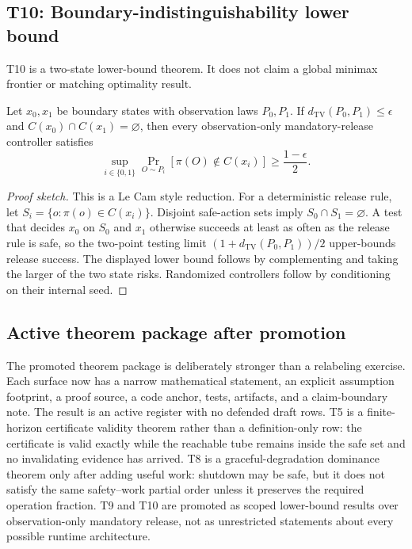 \subsection{T10: Boundary-indistinguishability lower bound}
T10 is a two-state lower-bound theorem.  It does not claim a global minimax
frontier or matching optimality result.

\begin{theorem}
\label{thm:prof-t10}
Let \(x_0,x_1\) be boundary states with observation laws \(P_0,P_1\). If
\(d_{\mathrm{TV}}(P_0,P_1)\le\epsilon\) and
\(C(x_0)\cap C(x_1)=\varnothing\), then every observation-only
mandatory-release controller satisfies
\[
  \sup_{i\in\{0,1\}}\Pr_{O\sim P_i}[\pi(O)\notin C(x_i)]
  \ge \frac{1-\epsilon}{2}.
\]
\end{theorem}

\begin{proof}[Proof sketch]
This is a Le Cam style reduction.  For a deterministic release rule, let
\(S_i=\{o:\pi(o)\in C(x_i)\}\).  Disjoint safe-action sets imply
\(S_0\cap S_1=\varnothing\).  A test that decides \(x_0\) on \(S_0\) and
\(x_1\) otherwise succeeds at least as often as the release rule is safe, so the
two-point testing limit \((1+d_{\mathrm{TV}}(P_0,P_1))/2\) upper-bounds release
success.  The displayed lower bound follows by complementing and taking the
larger of the two state risks.  Randomized controllers follow by conditioning
on their internal seed.
\end{proof}

\subsection{Active theorem package after promotion}
The promoted theorem package is deliberately stronger than a relabeling exercise.  Each
surface now has a narrow mathematical statement, an explicit assumption footprint, a
proof source, a code anchor, tests, artifacts, and a claim-boundary note.  The result is
an active register with no defended draft rows.  T5 is a finite-horizon certificate
validity theorem rather than a definition-only row: the certificate is valid exactly
while the reachable tube remains inside the safe set and no invalidating evidence has
arrived.  T8 is a graceful-degradation dominance theorem only after adding useful work:
shutdown may be safe, but it does not satisfy the same safety--work partial order unless
it preserves the required operation fraction.  T9 and T10 are promoted as scoped
lower-bound results over observation-only mandatory release, not as unrestricted
statements about every possible runtime architecture.

